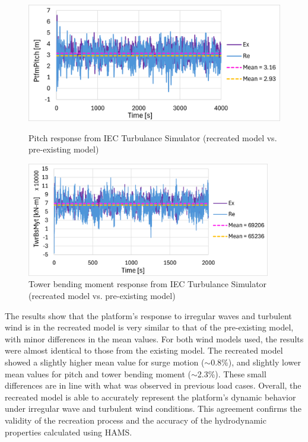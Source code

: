 \documentclass[a4paper, 11pt]{article}
\begin{document}
\begin{figure}[H]
    \begin{minipage}{0.48\textwidth}
        \centering
        \includegraphics[width=1\textwidth]{3.2_iec_pitch_mine.png}
        \caption{\small Pitch response from IEC Turbulance Simulator (recreated model vs. pre-existing model)}
        \label{fig:3.2_iec_pitch_mine_recreated}
    \end{minipage}
    \hfill
    \begin{minipage}{0.5\textwidth}
        \centering
        \includegraphics[width=0.95\textwidth]{3.2_iec_twr_mine.png}
        \caption{\small Tower bending moment response from IEC Turbulance Simulator (recreated model vs. pre-existing model)}
        \label{fig:3.2_iec_twr_mine_recreated}
    \end{minipage}
\end{figure}

The results show that the platform's response to irregular waves and turbulent wind is in the recreated model is very similar to that of the pre-existing model, with minor differences in the mean values. For both wind models used, the results were almost identical to those from the existing model. The recreated model showed a slightly higher mean value for surge motion ($\sim$0.8\%), and slightly lower mean values for pitch and tower bending moment ($\sim$2.3\%). These small differences are in line with what was observed in previous load cases. Overall, the recreated model is able to accurately represent the platform's dynamic behavior under irregular wave and turbulent wind conditions. This agreement confirms the validity of the recreation process and the accuracy of the hydrodynamic properties calculated using HAMS.
\end{document}
